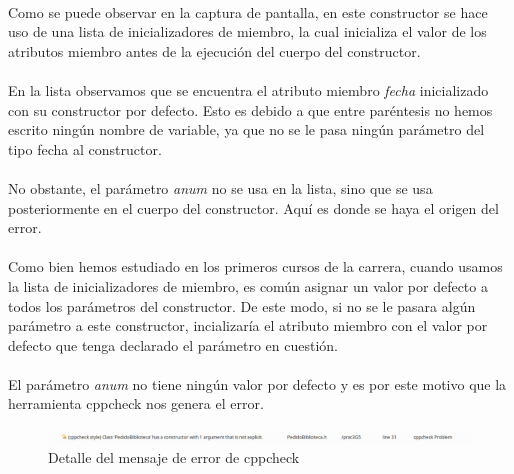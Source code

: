 			\paragraph{}Como se puede observar en la captura de pantalla, en este constructor se hace uso de una lista de inicializadores de miembro, la cual inicializa el valor de los atributos miembro antes de la ejecución del cuerpo del constructor.
			
			\paragraph{}En la lista observamos que se encuentra el atributo miembro \textit{fecha} inicializado con su constructor por defecto. Esto es debido a que entre paréntesis no hemos escrito ningún nombre de variable, ya que no se le pasa ningún parámetro del tipo fecha al constructor.
			
			\paragraph{}No obstante, el parámetro \textit{anum} no se usa en la lista, sino que se usa posteriormente en el cuerpo del constructor. Aquí es donde se haya el origen del error.
			
			\paragraph{}Como bien hemos estudiado en los primeros cursos de la carrera, cuando usamos la lista de inicializadores de miembro, es común asignar un valor por defecto a todos los parámetros del constructor. De este modo, si no se le pasara algún parámetro a este constructor, incializaría el atributo miembro con el valor por defecto que tenga declarado el parámetro en cuestión.
			
			\paragraph{}El parámetro \textit{anum} no tiene ningún valor por defecto y es por este motivo que la herramienta cppcheck nos genera el error. 
			
			\begin{figure}[H]
				\centering
				\includegraphics[scale=0.38]{img/captura52.png}
				\caption{Detalle del mensaje de error de cppcheck}
				\label{captura52}
			\end{figure}
	
